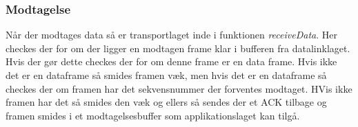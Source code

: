 \subsubsection{Modtagelse}
Når der modtages data så er transportlaget inde i funktionen \textit{receiveData}. Her checkes der for om der ligger en modtagen frame klar i bufferen fra datalinklaget. Hvis der gør dette checkes der for om denne frame er en data frame. Hvis ikke det er en dataframe så smides framen væk, men hvis det er en dataframe så checkes der om framen har det sekvensnummer der forventes modtaget. HVis ikke framen har det så smides den væk og ellers så sendes der et ACK tilbage og framen smides i et modtagelsesbuffer som applikationslaget kan tilgå.